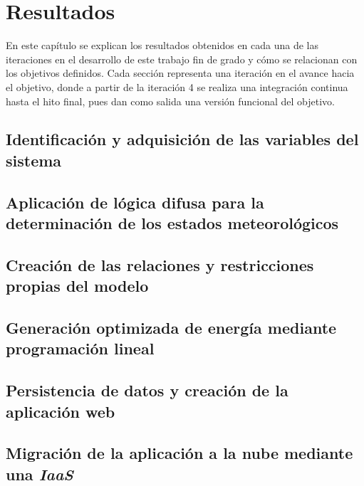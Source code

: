 \chapter{Resultados}
\label{cap:Resultados}
En este capítulo se explican los resultados obtenidos en cada una de las iteraciones en el desarrollo de este trabajo fin de grado y cómo se relacionan con los objetivos definidos. Cada sección representa una iteración en el avance hacia el objetivo, donde a partir de la iteración 4 se realiza una integración continua hasta el hito final, pues dan como salida una versión funcional del objetivo.

\section{Identificación y adquisición de las variables del sistema}

\section{Aplicación de lógica difusa para la determinación de los estados meteorológicos}

\section{Creación de las relaciones y restricciones propias del modelo}

\section{Generación optimizada de energía mediante programación lineal}

\section{Persistencia de datos y creación de la aplicación web}

\section{Migración de la aplicación a la nube mediante una \textit{IaaS}}

